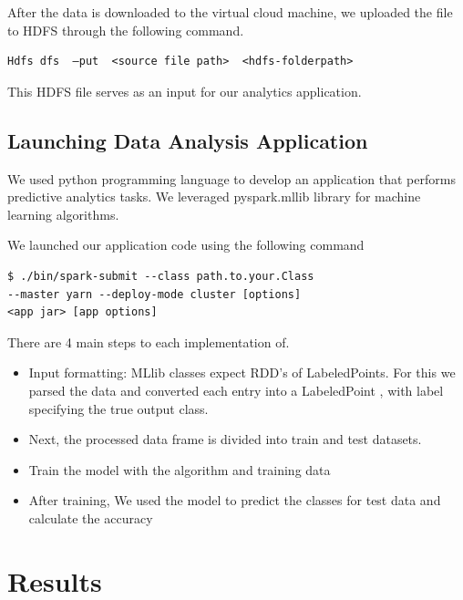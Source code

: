 \documentclass[9pt,twocolumn,twoside]{../../styles/osajnl}
\begin{document}
 
After the data is downloaded to the virtual cloud machine, we uploaded the file to HDFS through the following command.
\begin{verbatim}
Hdfs dfs  –put  <source file path>  <hdfs-folderpath>
\end{verbatim}

This HDFS file serves as an input for our analytics application.

\subsection{Launching Data Analysis Application}
 We used  python programming language to develop an application that  performs predictive analytics tasks. We leveraged  pyspark.mllib library for machine learning algorithms.
 
We launched our application code using the following command
\begin{verbatim}
$ ./bin/spark-submit --class path.to.your.Class 
--master yarn --deploy-mode cluster [options] 
<app jar> [app options]
\end{verbatim}

 There are 4 main steps to each implementation of.
 \begin{itemize}
  \item Input formatting: MLlib classes expect RDD’s of LabeledPoints. For this we parsed the data and converted each entry into a LabeledPoint , with label specifying the true output class.
\item Next, the processed data frame is divided into train and test datasets.
\item Train the model with the algorithm and training data
\item After  training, We used the model to predict the classes for test data and calculate the accuracy
 \end{itemize}

\section{Results}
\end{document}
